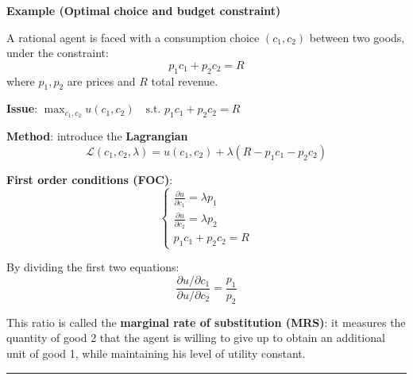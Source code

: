 \begin{f}
		\textbf{Example (Optimal choice and budget constraint)}
	
	A rational agent is faced with a consumption choice \((c_1, c_2)\) between two goods, under the constraint:
	\[
	p_1 c_1 + p_2 c_2 = R
	\]
	where \(p_1, p_2\) are prices and \(R\) total revenue.
	
	\textbf{Issue}:
	\(
	\max_{c_1, c_2} u(c_1, c_2) \quad \text{s.t. } p_1 c_1 + p_2 c_2 = R\)

	
	\textbf{Method}: introduce the \textbf{Lagrangian}
	\[
	\mathcal{L}(c_1, c_2, \lambda) = u(c_1, c_2) + \lambda (R - p_1 c_1 - p_2 c_2)
	\]
	
	\textbf{First order conditions (FOC)}:
	\[
	\begin{cases}
		\frac{\partial u}{\partial c_1} = \lambda p_1 \\
		\frac{\partial u}{\partial c_2} = \lambda p_2 \\
		p_1 c_1 + p_2 c_2 = R
	\end{cases}
	\]
	
	By dividing the first two equations:
	\[
	\frac{\partial u / \partial c_1}{\partial u / \partial c_2} = \frac{p_1}{p_2}
	\]
	
	This ratio is called the \textbf{marginal rate of substitution (MRS)}: it measures the quantity of good 2 that the agent is willing to give up to obtain an additional unit of good 1, while maintaining his level of utility constant.
	
\end{f}
\hrule

